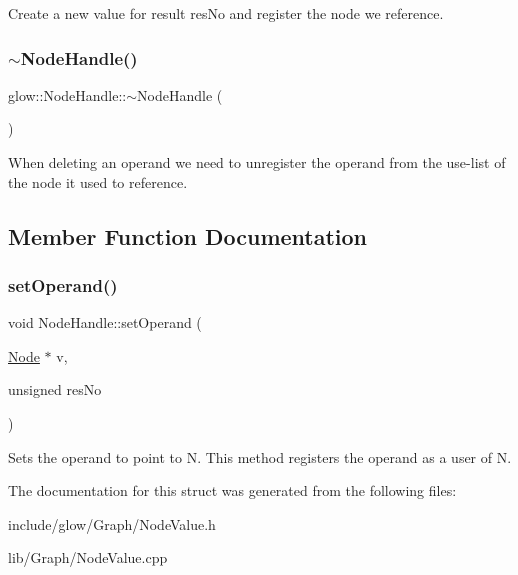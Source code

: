 Create a new value for result {\ttfamily res\+No} and register the node we reference. \mbox{\label{structglow_1_1_node_handle_a5d05908394a4401a5de3a244d55b843f}} 
\subsubsection{\texorpdfstring{$\sim$\+Node\+Handle()}{~NodeHandle()}}
{\footnotesize\ttfamily glow\+::\+Node\+Handle\+::$\sim$\+Node\+Handle (\begin{DoxyParamCaption}{ }\end{DoxyParamCaption})\hspace{0.3cm}{\ttfamily [inline]}}

When deleting an operand we need to unregister the operand from the use-\/list of the node it used to reference. 

\subsection{Member Function Documentation}
\mbox{\label{structglow_1_1_node_handle_a7747b243b3fab345ee117cf5d0e8d9bb}} 
\subsubsection{\texorpdfstring{set\+Operand()}{setOperand()}}
{\footnotesize\ttfamily void Node\+Handle\+::set\+Operand (\begin{DoxyParamCaption}\item[{\hyperlink{classglow_1_1_node}{Node} $\ast$}]{v,  }\item[{unsigned}]{res\+No }\end{DoxyParamCaption})}

Sets the operand to point to {\ttfamily N}. This method registers the operand as a user of {\ttfamily N}. 

The documentation for this struct was generated from the following files\+:\begin{DoxyCompactItemize}
\item 
include/glow/\+Graph/Node\+Value.\+h\item 
lib/\+Graph/Node\+Value.\+cpp\end{DoxyCompactItemize}
